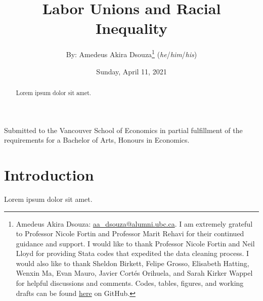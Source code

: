 \documentclass[11pt]{article}
\title{Labor Unions and Racial Inequality}
\author{By: Amedeus Akira Dsouza\thanks{Amedeus Akira Dsouza: \href{mailto:aa_dsouza@alumni.ubc.ca}{aa\_dsouza@alumni.ubc.ca}. I am extremely grateful to Professor Nicole Fortin and Professor Marit Rehavi for their continued guidance and support. I would like to thank Professor Nicole Fortin and Neil Lloyd for providing Stata codes that expedited the data cleaning process. I would also like to thank Sheldon Birkett, Felipe Grosso, Elisabeth Hatting, Wenxin Ma, Evan Mauro, Javier Cort\'{e}s Orihuela, and Sarah Kirker Wappel for helpful discussions and comments. Codes, tables, figures, and working drafts can be found \href{https://github.com/aadsouza/econ499}{here} on GitHub.} \textsc{ (}\textit{he}\textsc{/}\textit{him}\textsc{/}\textit{his}\textsc{)}}
\affil{University of British Columbia}
\affil{Supervised by: Nicole Fortin and M. Marit Rehavi}
\date{Sunday, April 11, 2021}
\begin{document}
\begin{titlepage}
\maketitle
\centering
\vspace{2cm}
Submitted to the Vancouver School of Economics in partial fulfillment of the requirements for a Bachelor of Arts, Honours in Economics.
\end{titlepage}
\thispagestyle{empty}
\doublespacing
\begin{abstract}
Lorem ipsum dolor sit amet.
\end{abstract}
\clearpage
{}
\section{Introduction}
Lorem ipsum dolor sit amet.

\end{document}
